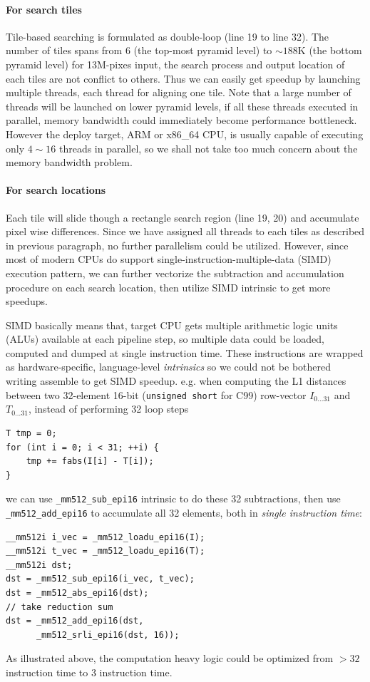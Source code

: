 \documentclass[conference, 10pt]{IEEEtran}
\makeatletter
\newcommand*{\eg}{e.g.\@\xspace}
\makeatother
\begin{document}
\paragraph{For search tiles} \label{sec::for_tile} Tile-based searching is formulated as double-loop (line 19
to line 32). The number of tiles spans from $6$ (the top-most pyramid level) to $\sim 188$K
(the bottom pyramid level) for 13M-pixes input, the search process and output location
of each tiles are not conflict to others. Thus we can easily get speedup by launching
multiple threads, each thread for aligning one tile.
Note that a large number of threads will be launched on lower pyramid levels,
if all these threads executed in parallel, memory bandwidth could immediately
become performance bottleneck.
However the deploy target, ARM or x86\_64 CPU, is usually capable of executing only
$4 \sim 16$ threads in parallel, so we shall not take too much concern about the memory
bandwidth problem.

\paragraph{For search locations} \label{sec::simd} Each tile will slide though a rectangle search region
(line 19, 20) and accumulate pixel wise differences. Since we have assigned all threads
to each tiles as described in previous paragraph, no further parallelism could be utilized.
However, since most of modern CPUs do support single-instruction-multiple-data (SIMD) execution
pattern, we can further vectorize the subtraction and accumulation procedure on each
search location, then utilize SIMD intrinsic to get more speedups.

SIMD basically means that, target CPU gets multiple arithmetic logic units (ALUs)
available at each pipeline step, so multiple data could be loaded, computed and
dumped at single instruction time. These instructions are wrapped as hardware-specific,
language-level \emph{intrinsics} so we could not be bothered writing assemble to
get SIMD speedup. 
\eg when computing the L1 distances between two 32-element 16-bit ({\tt unsigned short} for C99) row-vector 
$I_{0\ldots 31}$ and $T_{0\ldots 31}$, instead of performing 32 loop steps
\begin{verbatim}
T tmp = 0;
for (int i = 0; i < 31; ++i) {
    tmp += fabs(I[i] - T[i]);
}
\end{verbatim}
we can use {\tt \_mm512\_sub\_epi16} intrinsic to do these 32 subtractions, then use {\tt \_mm512\_add\_epi16} to accumulate all
32 elements, both in \emph{single instruction time}:
\begin{verbatim}
__mm512i i_vec = _mm512_loadu_epi16(I);
__mm512i t_vec = _mm512_loadu_epi16(T);
__mm512i dst;
dst = _mm512_sub_epi16(i_vec, t_vec);
dst = _mm512_abs_epi16(dst);
// take reduction sum
dst = _mm512_add_epi16(dst,
      _mm512_srli_epi16(dst, 16));
\end{verbatim}
As illustrated above, the computation heavy logic could be optimized from $> 32$ instruction
time to $3$ instruction time.
\end{document}
